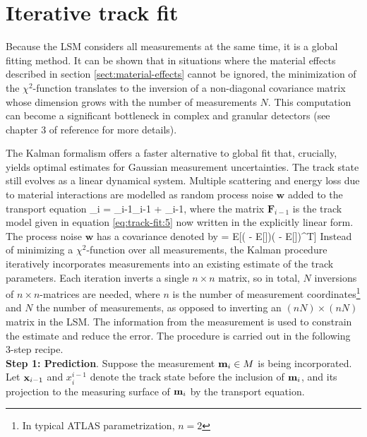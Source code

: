 \section{Iterative track fit}
\label{sect:kalman-filter}

Because the LSM considers all measurements at the same time, it is a global fitting method. 
It can be shown that in situations where the material effects described in section \ref{sect:material-effects} cannot be ignored, the minimization of the $\chi^2$-function translates to the inversion of a non-diagonal covariance matrix whose dimension grows with the number of measurements $N$. 
This computation can become a significant bottleneck in complex and granular detectors (see chapter 3 of reference \cite{Regler2000-ie} for more details).

The Kalman formalism \cite{Mankel_2004, BILLOIR1984352, FRUHWIRTH1987444} offers a faster alternative to global fit that, crucially, yields optimal estimates for Gaussian measurement uncertainties. 
The track state still evolves as a linear dynamical system.
Multiple scattering and energy loss due to material interactions are modelled as random process noise $\mathbf{w}$ added to the transport equation 
\beq
\label{eq:track-fit:12}
\bfx_i = _{i-1}\bfx_{i-1} + _{i-1},
\eeq
where the matrix $\mathbf{F}_{i-1}$ is the track model given in equation \eqref{eq:track-fit:5} now written in the explicitly linear form. 
The process noise $\mathbf{w}$ has a covariance denoted by
\beq
\label{eq:track-fit:13}
 = E[( - E[])( - E[])^T]
\eeq
Instead of minimizing a $\chi^2$-function over all measurements, the Kalman procedure iteratively incorporates measurements into an existing estimate of the track parameters. 
Each iteration inverts a single $n\times n$ matrix, so in total, $N$ inversions of $n\times n$-matrices are needed, where $n$ is the number of measurement coordinates\footnote{In typical ATLAS parametrization, $n=2$} and $N$ the number of measurements, as opposed to inverting an $(nN)\times (nN)$ matrix in the LSM.
The information from the measurement is used to constrain the estimate and reduce the error. 
The procedure is carried out in the following 3-step recipe. \\
\textbf{Step 1: Prediction}. Suppose the measurement $\mathbf{m}_i\in M$ is being incorporated. 
Let $\mathbf{x}_{i-1}$ and $x_{i}^{i-1}$ denote the track state before the inclusion of $\mathbf{m}_i$, and its projection to the measuring surface of $\mathbf{m}_i$ by the transport equation.
